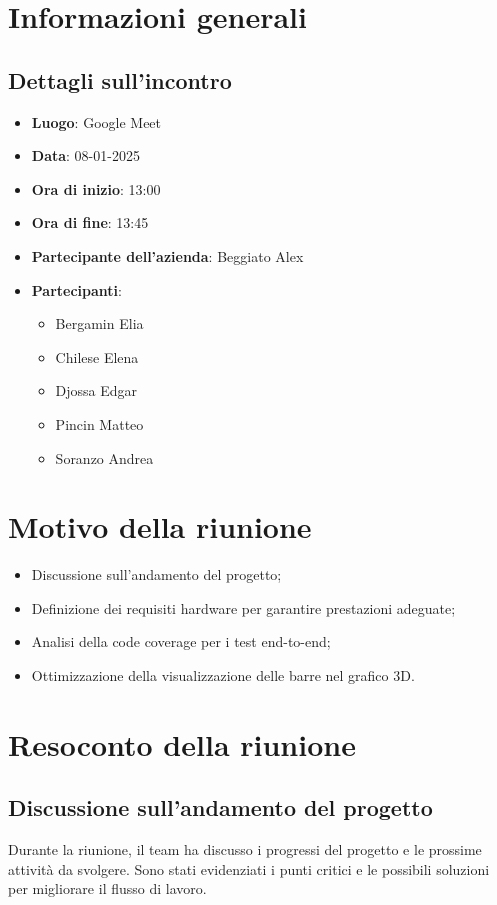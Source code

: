 \section{Informazioni generali}
\subsection{Dettagli sull'incontro}
\begin{itemize}
    \item \textbf{Luogo}: Google Meet
    \item \textbf{Data}: 08-01-2025
    \item \textbf{Ora di inizio}: 13:00
    \item \textbf{Ora di fine}: 13:45
    \item \textbf{Partecipante dell'azienda}: Beggiato Alex
    \item \textbf{Partecipanti}:
    \begin{itemize}
        \item Bergamin Elia
        \item Chilese Elena
        \item Djossa Edgar
        \item Pincin Matteo 
        \item Soranzo Andrea  
    \end{itemize}
\end{itemize}

\section{Motivo della riunione}
\begin{itemize}
\item Discussione sull'andamento del progetto;
\item Definizione dei requisiti hardware per garantire prestazioni adeguate;
\item Analisi della code coverage per i test end-to-end;
\item Ottimizzazione della visualizzazione delle barre nel grafico 3D.
\end{itemize}

\section{Resoconto della riunione}
\subsection{Discussione sull'andamento del progetto}
Durante la riunione, il team ha discusso i progressi del progetto e le prossime attività da svolgere. Sono stati evidenziati i punti critici e le possibili soluzioni per migliorare il flusso di lavoro.

